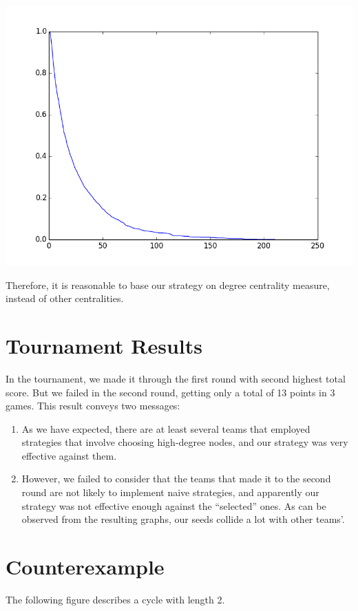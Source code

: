 \documentclass[12pt]{article}
\begin{document}
\begin{center}
\includegraphics[scale = 0.8]{webgraph_ccdf}
\end{center}
Therefore, it is reasonable to base our strategy on degree centrality measure, instead of other centralities. 


\section{Tournament Results}
In the tournament, we made it through the first round with second highest total score. But we failed in the second round, getting only a total of 13 points in 3 games. This result conveys two messages:
\begin{enumerate}
\item As we have expected, there are at least several teams that employed strategies that involve choosing high-degree nodes, and our strategy was very effective against them. 
\item However, we failed to consider that the teams that made it to the second round are not likely to implement naive strategies, and apparently our strategy was not effective enough against the ``selected'' ones. As can be observed from the resulting graphs, our seeds collide a lot with other teams'.
\end{enumerate}

\section{Counterexample}
The following figure describes a cycle with length 2.\\
\end{document}
